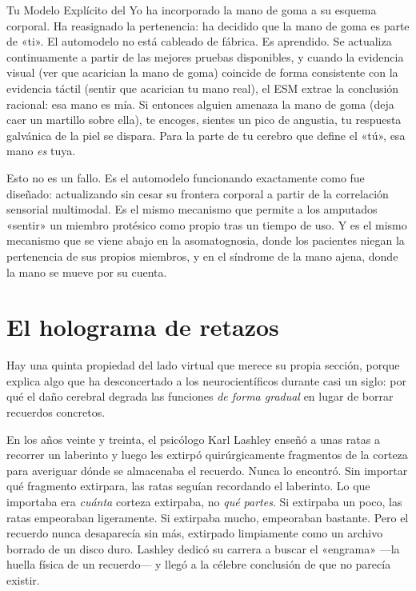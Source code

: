 \documentclass[11pt, twoside, openright]{book}
\begin{document}
Tu Modelo Explícito del Yo ha incorporado la mano de goma a su esquema corporal. Ha reasignado la pertenencia: ha decidido que la mano de goma es parte de «ti». El automodelo no está cableado de fábrica. Es aprendido. Se actualiza continuamente a partir de las mejores pruebas disponibles, y cuando la evidencia visual (ver que acarician la mano de goma) coincide de forma consistente con la evidencia táctil (sentir que acarician tu mano real), el ESM extrae la conclusión racional: esa mano es mía. Si entonces alguien amenaza la mano de goma (deja caer un martillo sobre ella), te encoges, sientes un pico de angustia, tu respuesta galvánica de la piel se dispara. Para la parte de tu cerebro que define el «tú», esa mano \textit{es} tuya.

Esto no es un fallo. Es el automodelo funcionando exactamente como fue diseñado: actualizando sin cesar su frontera corporal a partir de la correlación sensorial multimodal. Es el mismo mecanismo que permite a los amputados «sentir» un miembro protésico como propio tras un tiempo de uso. Y es el mismo mecanismo que se viene abajo en la asomatognosia, donde los pacientes niegan la pertenencia de sus propios miembros, y en el síndrome de la mano ajena, donde la mano se mueve por su cuenta.

\section*{El holograma de retazos}

Hay una quinta propiedad del lado virtual que merece su propia sección, porque explica algo que ha desconcertado a los neurocientíficos durante casi un siglo: por qué el daño cerebral degrada las funciones \textit{de forma gradual} en lugar de borrar recuerdos concretos.

En los años veinte y treinta, el psicólogo Karl Lashley enseñó a unas ratas a recorrer un laberinto y luego les extirpó quirúrgicamente fragmentos de la corteza para averiguar dónde se almacenaba el recuerdo. Nunca lo encontró. Sin importar qué fragmento extirpara, las ratas seguían recordando el laberinto. Lo que importaba era \textit{cuánta} corteza extirpaba, no \textit{qué partes}. Si extirpaba un poco, las ratas empeoraban ligeramente. Si extirpaba mucho, empeoraban bastante. Pero el recuerdo nunca desaparecía sin más, extirpado limpiamente como un archivo borrado de un disco duro. Lashley dedicó su carrera a buscar el «engrama» ---la huella física de un recuerdo--- y llegó a la célebre conclusión de que no parecía existir.
\end{document}
